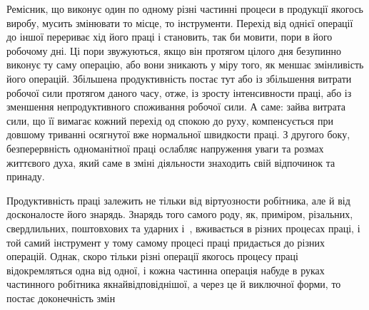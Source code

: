 Ремісник, що виконує один по одному різні частинні процеси
в продукції якогось виробу, мусить змінювати то місце, то інструменти. Перехід
від однієї операції до іншої перериває хід його праці і становить, так би
мовити, пори в його робочому дні. Ці пори
звужуються, якщо він протягом цілого дня безупинно
виконує ту саму операцію, або вони зникають у міру того, як
меншає змінливість його операцій. Збільшена продуктивність
постає тут або із збільшення витрати робочої сили протягом
даного часу, отже, із зросту інтенсивности праці, або із зменшення
непродуктивного споживання робочої сили. А саме: зайва витрата
сили, що її вимагає кожний перехід од спокою до руху, компенсується при довшому
триванні осягнутої вже нормальної швидкости
праці. З другого боку, безперервність одноманітної праці ослабляє
напруження уваги та розмах життєвого духа, який саме в зміні
діяльности знаходить свій відпочинок та принаду.

Продуктивність праці залежить не тільки від віртуозности
робітника, але й від досконалосте його знарядь. Знарядь того
самого роду, як, приміром, різальних, свердлильних, поштовхових та ударних і~, вживається в різних процесах праці, і той самий інструмент у тому
самому процесі праці придається до різних операцій. Однак, скоро тільки різні
операції якогось процесу праці відокремляться одна від одної, і кожна частинна
операція набуде в руках частинного робітника якнайвідповіднішої, а через це й
виключної форми, то постає доконечність змін\parbreak{}
